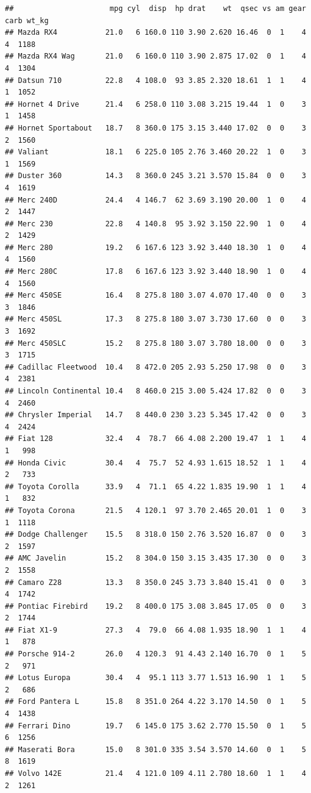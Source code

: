 \documentclass[]{book}
\begin{document}
\begin{verbatim}
##                      mpg cyl  disp  hp drat    wt  qsec vs am gear carb wt_kg
## Mazda RX4           21.0   6 160.0 110 3.90 2.620 16.46  0  1    4    4  1188
## Mazda RX4 Wag       21.0   6 160.0 110 3.90 2.875 17.02  0  1    4    4  1304
## Datsun 710          22.8   4 108.0  93 3.85 2.320 18.61  1  1    4    1  1052
## Hornet 4 Drive      21.4   6 258.0 110 3.08 3.215 19.44  1  0    3    1  1458
## Hornet Sportabout   18.7   8 360.0 175 3.15 3.440 17.02  0  0    3    2  1560
## Valiant             18.1   6 225.0 105 2.76 3.460 20.22  1  0    3    1  1569
## Duster 360          14.3   8 360.0 245 3.21 3.570 15.84  0  0    3    4  1619
## Merc 240D           24.4   4 146.7  62 3.69 3.190 20.00  1  0    4    2  1447
## Merc 230            22.8   4 140.8  95 3.92 3.150 22.90  1  0    4    2  1429
## Merc 280            19.2   6 167.6 123 3.92 3.440 18.30  1  0    4    4  1560
## Merc 280C           17.8   6 167.6 123 3.92 3.440 18.90  1  0    4    4  1560
## Merc 450SE          16.4   8 275.8 180 3.07 4.070 17.40  0  0    3    3  1846
## Merc 450SL          17.3   8 275.8 180 3.07 3.730 17.60  0  0    3    3  1692
## Merc 450SLC         15.2   8 275.8 180 3.07 3.780 18.00  0  0    3    3  1715
## Cadillac Fleetwood  10.4   8 472.0 205 2.93 5.250 17.98  0  0    3    4  2381
## Lincoln Continental 10.4   8 460.0 215 3.00 5.424 17.82  0  0    3    4  2460
## Chrysler Imperial   14.7   8 440.0 230 3.23 5.345 17.42  0  0    3    4  2424
## Fiat 128            32.4   4  78.7  66 4.08 2.200 19.47  1  1    4    1   998
## Honda Civic         30.4   4  75.7  52 4.93 1.615 18.52  1  1    4    2   733
## Toyota Corolla      33.9   4  71.1  65 4.22 1.835 19.90  1  1    4    1   832
## Toyota Corona       21.5   4 120.1  97 3.70 2.465 20.01  1  0    3    1  1118
## Dodge Challenger    15.5   8 318.0 150 2.76 3.520 16.87  0  0    3    2  1597
## AMC Javelin         15.2   8 304.0 150 3.15 3.435 17.30  0  0    3    2  1558
## Camaro Z28          13.3   8 350.0 245 3.73 3.840 15.41  0  0    3    4  1742
## Pontiac Firebird    19.2   8 400.0 175 3.08 3.845 17.05  0  0    3    2  1744
## Fiat X1-9           27.3   4  79.0  66 4.08 1.935 18.90  1  1    4    1   878
## Porsche 914-2       26.0   4 120.3  91 4.43 2.140 16.70  0  1    5    2   971
## Lotus Europa        30.4   4  95.1 113 3.77 1.513 16.90  1  1    5    2   686
## Ford Pantera L      15.8   8 351.0 264 4.22 3.170 14.50  0  1    5    4  1438
## Ferrari Dino        19.7   6 145.0 175 3.62 2.770 15.50  0  1    5    6  1256
## Maserati Bora       15.0   8 301.0 335 3.54 3.570 14.60  0  1    5    8  1619
## Volvo 142E          21.4   4 121.0 109 4.11 2.780 18.60  1  1    4    2  1261
\end{verbatim}
\end{document}
